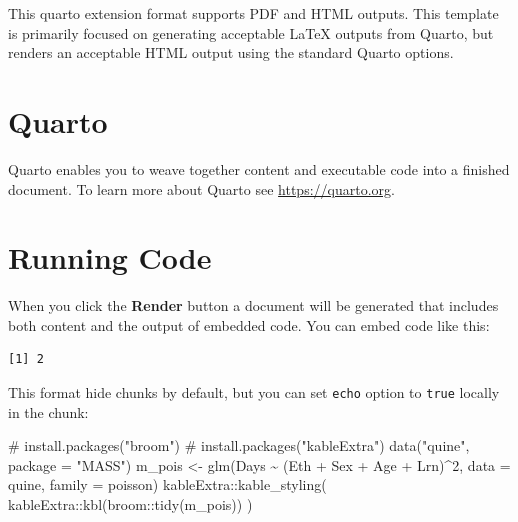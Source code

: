 \documentclass[
]{article}
\newenvironment{Shaded}{\begin{snugshade}}{\end{snugshade}}
\newcommand{\AttributeTok}[1]{\textcolor[rgb]{0.40,0.45,0.13}{#1}}
\newcommand{\CommentTok}[1]{\textcolor[rgb]{0.37,0.37,0.37}{#1}}
\newcommand{\DecValTok}[1]{\textcolor[rgb]{0.68,0.00,0.00}{#1}}
\newcommand{\FunctionTok}[1]{\textcolor[rgb]{0.28,0.35,0.67}{#1}}
\newcommand{\NormalTok}[1]{\textcolor[rgb]{0.00,0.23,0.31}{#1}}
\newcommand{\OtherTok}[1]{\textcolor[rgb]{0.00,0.23,0.31}{#1}}
\newcommand{\SpecialCharTok}[1]{\textcolor[rgb]{0.37,0.37,0.37}{#1}}
\newcommand{\StringTok}[1]{\textcolor[rgb]{0.13,0.47,0.30}{#1}}
\begin{document}
This quarto extension format supports PDF and HTML outputs. This
template is primarily focused on generating acceptable {\LaTeX} outputs
from Quarto, but renders an acceptable HTML output using the standard
Quarto options.

\hypertarget{quarto}{%
\section{Quarto}\label{quarto}}

Quarto enables you to weave together content and executable code into a
finished document. To learn more about Quarto see
\url{https://quarto.org}.

\hypertarget{running-code}{%
\section{Running Code}\label{running-code}}

When you click the \textbf{Render} button a document will be generated
that includes both content and the output of embedded code. You can
embed code like this:

\begin{verbatim}
[1] 2
\end{verbatim}

This format hide chunks by default, but you can set \texttt{echo} option
to \texttt{true} locally in the chunk:

\begin{Shaded}
\begin{Highlighting}[]
\CommentTok{\# install.packages("broom")}
\CommentTok{\# install.packages("kableExtra")}
\FunctionTok{data}\NormalTok{(}\StringTok{"quine"}\NormalTok{, }\AttributeTok{package =} \StringTok{"MASS"}\NormalTok{)}
\NormalTok{m\_pois }\OtherTok{\textless{}{-}} \FunctionTok{glm}\NormalTok{(Days }\SpecialCharTok{\textasciitilde{}}\NormalTok{ (Eth }\SpecialCharTok{+}\NormalTok{ Sex }\SpecialCharTok{+}\NormalTok{ Age }\SpecialCharTok{+}\NormalTok{ Lrn)}\SpecialCharTok{\^{}}\DecValTok{2}\NormalTok{, }\AttributeTok{data =}\NormalTok{ quine, }\AttributeTok{family =}\NormalTok{ poisson)}
\NormalTok{kableExtra}\SpecialCharTok{::}\FunctionTok{kable\_styling}\NormalTok{(}
\NormalTok{  kableExtra}\SpecialCharTok{::}\FunctionTok{kbl}\NormalTok{(broom}\SpecialCharTok{::}\FunctionTok{tidy}\NormalTok{(m\_pois))}
\NormalTok{)}
\end{Highlighting}
\end{Shaded}
\end{document}
